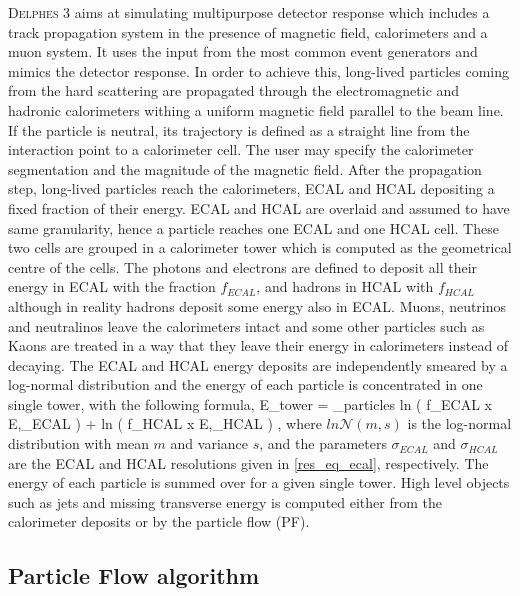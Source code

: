 \textsc{Delphes 3} aims at simulating multipurpose detector response which includes a track propagation system in the presence of magnetic field, calorimeters and a muon system. It uses the input from the most common event generators and mimics the detector response. In order to achieve this, long-lived particles coming from the hard scattering are propagated through the electromagnetic and hadronic calorimeters withing a uniform magnetic field parallel to the beam line. If the particle is neutral, its trajectory is defined as a straight line from the interaction point to a calorimeter cell. The user may specify the calorimeter segmentation and the magnitude of the magnetic field. After the propagation step, long-lived particles reach the calorimeters, ECAL and HCAL depositing a fixed fraction of their energy. ECAL and HCAL are overlaid and assumed to have same granularity, hence a particle reaches one ECAL and one HCAL cell. These two cells are grouped in a calorimeter tower which is computed as the geometrical centre of the cells. The photons and electrons are defined to deposit all their energy in ECAL with the fraction $f_{ECAL}$, and hadrons in HCAL with $f_{HCAL}$ although in reality hadrons deposit some energy also in ECAL. Muons, neutrinos and neutralinos leave the calorimeters intact and some other particles such as Kaons are treated in a way that they leave their energy in calorimeters instead of decaying. The ECAL and HCAL energy deposits are independently smeared by a log-normal distribution and the energy of each particle is concentrated in one single tower, with the following formula,
\be
E_{tower} = \sum_{particles} ln \left( f_{ECAL} \; x \; E,\sigma_{ECAL} \right) + ln \left( f_{HCAL} \; x \; E,\sigma_{HCAL} \right) \; ,
\ee
where $ln\mathcal{N}\left(m,s\right)$ is the log-normal distribution with mean $m$ and variance $s$, and the parameters $\sigma_{ECAL}$ and $\sigma_{HCAL}$ are the ECAL and HCAL resolutions given in \autoref{res_eq_ecal}, respectively. The energy of each particle is summed over for a given single tower. High level objects such as jets and missing transverse energy is computed either from the calorimeter deposits or by the particle flow (PF).

\subsection{Particle Flow algorithm}\label{pf_section}

